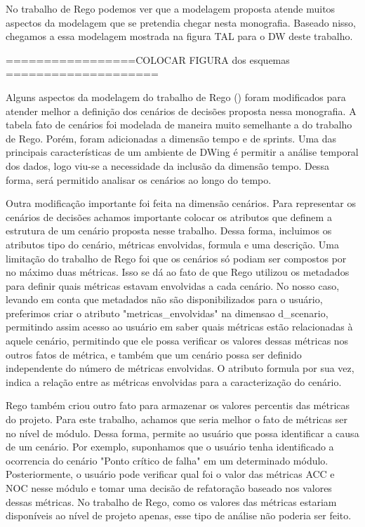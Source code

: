 No trabalho de Rego \citeyear{rego2014} podemos ver que a modelagem proposta atende muitos aspectos da modelagem que se pretendia chegar nesta monografia. Baseado nisso, chegamos a essa modelagem mostrada na figura TAL para o DW deste trabalho.

=================COLOCAR FIGURA dos esquemas ====================


Alguns aspectos da modelagem do trabalho de Rego (\citeyear{rego2014}) foram modificados para atender melhor a definição dos cenários de decisões proposta nessa monografia. A tabela fato de cenários foi modelada de maneira muito semelhante a do trabalho de Rego. Porém, foram adicionadas a dimensão tempo e de sprints. Uma das principais características de um ambiente de DWing é permitir a análise temporal dos dados, logo viu-se a necessidade da inclusão da dimensão tempo. Dessa forma, será permitido analisar os cenários ao longo do tempo. 

Outra modificação importante foi feita na dimensão cenários. Para representar os cenários de decisões achamos importante colocar os atributos que definem a estrutura de um cenário proposta nesse trabalho. Dessa forma, incluimos os atributos tipo do cenário, métricas envolvidas, formula e uma descrição. Uma limitação do trabalho de Rego foi que os cenários só podiam ser compostos por no máximo duas métricas. Isso se dá ao fato de que Rego utilizou os metadados para definir quais métricas estavam envolvidas a cada cenário. No nosso caso, levando em conta que  metadados não são disponibilizados para o usuário, preferimos criar o atributo "metricas\_envolvidas" na dimensao d\_scenario, permitindo assim acesso ao usuário em saber quais métricas estão relacionadas à aquele cenário, permitindo que ele possa verificar os valores dessas métricas nos outros fatos de métrica, e também que um cenário possa ser definido independente do número de métricas envolvidas. O atributo formula por sua vez, indica a relação entre as métricas envolvidas para a caracterização do cenário.


Rego também criou outro fato para armazenar os valores percentis das métricas do projeto. Para este trabalho, achamos que seria melhor o fato de métricas ser no nível de módulo. Dessa forma, permite ao usuário que possa identificar a causa de um cenário. Por exemplo, suponhamos que o usuário tenha identificado a ocorrencia do cenário "Ponto crítico de falha" em um determinado módulo. Posteriormente, o usuário pode verificar qual foi o valor das métricas ACC e NOC nesse módulo e tomar uma decisão de refatoração baseado nos valores dessas métricas. No trabalho de Rego, como os valores das métricas estariam disponíveis ao nível de projeto apenas, esse tipo de análise não poderia ser feito.

